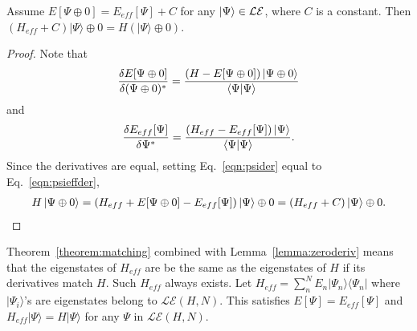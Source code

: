 \begin{theorem}
\label{theorem:matching}
Assume $ E[\Psi\oplus 0]  = E_{eff}[\Psi]+C$ for any $\ket{\Psi } \in \mathcal{LE}$, where $C$ is a constant. 
Then $(H_{eff}+C)|\Psi\rangle\oplus 0 = H (|\Psi\rangle \oplus 0)$.
\end{theorem}
\begin{proof}
Note that
\begin{align}
	\frac{\delta E[\Psi\oplus 0]}{\delta (\Psi\oplus 0)^*}=\frac{(H-E[\Psi\oplus 0])\ket{\Psi\oplus 0} }{\braket{\Psi|\Psi}}
	\label{eqn:psider}
\end{align}
and 
\begin{align}
	\frac{\delta E_{eff}[\Psi]}{\delta \Psi^*}=\frac{(H_{eff}-E_{eff}[\Psi])\ket{\Psi} }{\braket{\Psi|\Psi}}.
	\label{eqn:psieffder}
\end{align}
Since the derivatives are equal, setting Eq.~\eqref{eqn:psider} equal to Eq.~\eqref{eqn:psieffder},
\begin{align}
	 H\ket{\Psi\oplus 0}= (H_{eff}+E[\Psi\oplus 0]-E_{eff}[\Psi])\ket{\Psi}\oplus 0 =(H_{eff}+C)\ket{\Psi}\oplus 0.
\end{align}
\end{proof}


Theorem~\ref{theorem:matching} combined with Lemma~\ref{lemma:zeroderiv} means that the eigenstates of $H_{eff}$ are be the same as the eigenstates of $H$ if its derivatives match $H$. 
Such $H_{eff}$ always exists. 
Let $H_{eff} = \sum_{n}^N E_n |\Psi_n\rangle \langle \Psi_n|$ where $|\Psi_i\rangle$'s are eigenstates belong to $\mathcal{LE}(H,N)$. This satisfies $E[\Psi] = E_{eff}[\Psi]$ and $H_{eff}|\Psi\rangle = H |\Psi \rangle$ for any $\Psi$ in $\mathcal{LE}(H,N)$.  

